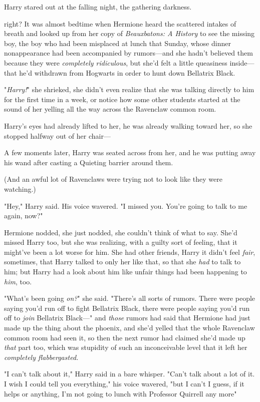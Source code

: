 Harry stared out at the falling night, the gathering darkness.

{\el} right?
\sbreak
It was almost bedtime when Hermione heard the scattered intakes of breath and
looked up from her copy of \emph{Beauxbatons: A History} to see the missing
boy, the boy who had been misplaced at lunch that Sunday, whose dinner
nonappearance had been accompanied by rumors---and she hadn't believed them
because they were \emph{completely ridiculous}, but she'd felt a little
queasiness inside---that he'd withdrawn from Hogwarts in order to hunt down
Bellatrix Black.

"\emph{Harry!}" she shrieked, she didn't even realize that she was talking
directly to him for the first time in a week, or notice how some other students
started at the sound of her yelling all the way across the Ravenclaw common
room.

Harry's eyes had already lifted to her, he was already walking toward her, so
she stopped halfway out of her chair---

A few moments later, Harry was seated across from her, and he was putting away
his wand after casting a Quieting barrier around them.

(And an awful lot of Ravenclaws were trying not to look like they were
watching.)

"Hey," Harry said. His voice wavered. "I missed you. You're{\el} going to
talk to me again, now?"

Hermione nodded, she just nodded, she couldn't think of what to say. She'd
missed Harry too, but she was realizing, with a guilty sort of feeling, that it
might've been a lot worse for him. She had other friends, Harry{\el} it
didn't feel \emph{fair}, sometimes, that Harry talked to only her like that, so
that she \emph{had} to talk to him; but Harry had a look about him like unfair
things had been happening to \emph{him}, too.

"What's been going \emph{on?}" she said. "There's all sorts of rumors. There
were people saying you'd run off to fight Bellatrix Black, there were people
saying you'd run off to \emph{join} Bellatrix Black---" and \emph{those} rumors
had said that Hermione had just made up the thing about the phoenix, and she'd
yelled that the whole Ravenclaw common room had seen it, so then the next rumor
had claimed she'd made up \emph{that} part too, which was stupidity of such an
inconceivable level that it left her \emph{completely flabbergasted.}

"I can't talk about it," Harry said in a bare whisper. "Can't talk about a lot
of it. I wish I could tell you everything," his voice wavered, "but I
can't{\el} I guess, if it helps or anything, I'm not going to lunch with
Professor Quirrell any more{\el}"

